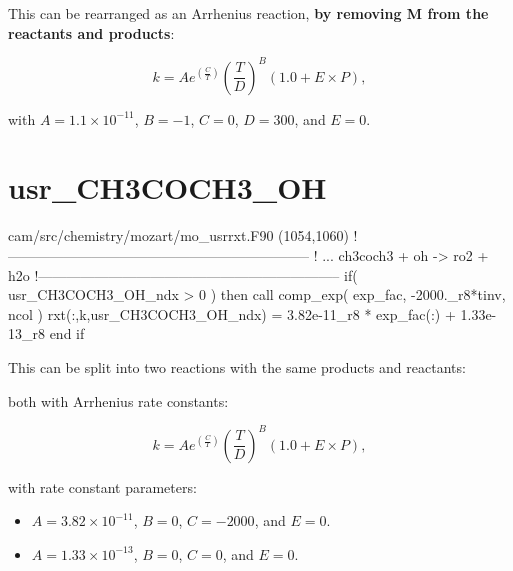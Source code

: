 \documentclass[titlepage]{article}
\begin{document}
This can be rearranged as an Arrhenius reaction, \textbf{by removing M from the reactants and products}:

\begin{equation}
k = Ae^{(\frac{C}{T})}(\frac{T}{D})^B(1.0+E \times P),
\end{equation}

\noindent with $A = 1.1 \times 10^{-11}$, $B = -1$, $C = 0$, $D = 300$, and $E = 0$.


\section{usr\_CH3COCH3\_OH}

\begin{blockcode}[commandchars=\\\{\}]
\color{gray}cam/src/chemistry/mozart/mo_usrrxt.F90 (1054,1060)
!-----------------------------------------------------------------
!       ... ch3coch3 + oh -> ro2 + h2o
!-----------------------------------------------------------------
       if( usr_CH3COCH3_OH_ndx > 0 ) then
          call comp_exp( exp_fac, -2000._r8*tinv, ncol )
          rxt(:,k,usr_CH3COCH3_OH_ndx) = 3.82e-11_r8 * exp_fac(:) + 1.33e-13_r8
       end if
\end{blockcode}

This can be split into two reactions with the same products and reactants:
\vspace{20px}


\vspace{20px}

\noindent both with Arrhenius rate constants:

\begin{equation}
k = Ae^{(\frac{C}{T})}(\frac{T}{D})^B(1.0+E \times P),
\end{equation}

\noindent with rate constant parameters:

\begin{itemize}
  \item $A = 3.82 \times 10^{-11}$, $B = 0$, $C = -2000$, and $E = 0$.
  \item $A = 1.33 \times 10^{-13}$, $B = 0$, $C = 0$, and $E = 0$.
\end{itemize}

\end{document}
